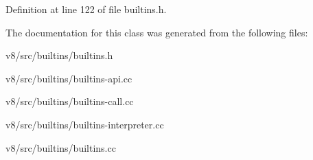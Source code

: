 Definition at line 122 of file builtins.\+h.



The documentation for this class was generated from the following files\+:\begin{DoxyCompactItemize}
\item 
v8/src/builtins/builtins.\+h\item 
v8/src/builtins/builtins-\/api.\+cc\item 
v8/src/builtins/builtins-\/call.\+cc\item 
v8/src/builtins/builtins-\/interpreter.\+cc\item 
v8/src/builtins/builtins.\+cc\end{DoxyCompactItemize}
